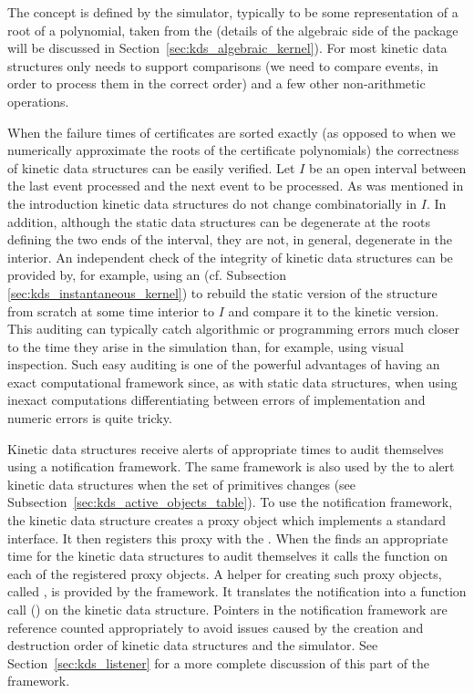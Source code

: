The  concept is defined by the simulator, typically to be
some representation of a root of a polynomial, taken from the
 (details of the algebraic side of the package
will be discussed in Section~\ref{sec:kds_algebraic_kernel}). For most
kinetic data structures  only needs to support
comparisons (we need to compare events, in order to process them in
the correct order) and a few other non-arithmetic operations.

When the failure times of certificates are sorted exactly (as opposed
to when we numerically approximate the roots of the certificate
polynomials) the correctness of kinetic data structures can be easily
verified.  Let $I$ be an open interval between the last event
processed and the next event to be processed.  As was mentioned in the
introduction kinetic data structures do not change combinatorially in
$I$. In addition, although the static data structures can be
degenerate at the roots defining the two ends of the interval, they
are not, in general, degenerate in the interior. An independent check
of the integrity of kinetic data structures can be provided by, for
example, using an  (cf. Subsection
\ref{sec:kds_instantaneous_kernel}) to rebuild the static version of the
structure from scratch at some time interior to $I$ and compare it to
the kinetic version. This auditing can typically catch algorithmic or
programming errors much closer to the time they arise in the
simulation than, for example, using visual inspection.  Such easy
auditing is one of the powerful advantages of having an exact
computational framework since, as with static data structures, when
using inexact computations differentiating between errors of
implementation and numeric errors is quite tricky.

Kinetic data structures receive alerts of appropriate times to audit
themselves using a notification framework. The same framework is also
used by the  to alert kinetic data
structures when the set of primitives changes (see
Subsection~\ref{sec:kds_active_objects_table}). To use the notification
framework, the kinetic data structure creates a proxy object which
implements a standard  interface. It then registers this
proxy with the . When the
 finds an appropriate time for the kinetic
data structures to audit themselves it calls the function
 on each of the registered proxy
objects.  A helper for creating such proxy objects, called
, is provided by the
framework. It translates the notification into a function call
() on the kinetic data structure.  Pointers in the
notification framework are reference counted appropriately to avoid
issues caused by the creation and destruction order of kinetic data
structures and the simulator. See Section~\ref{sec:kds_listener} for a more
complete discussion of this part of the framework.

